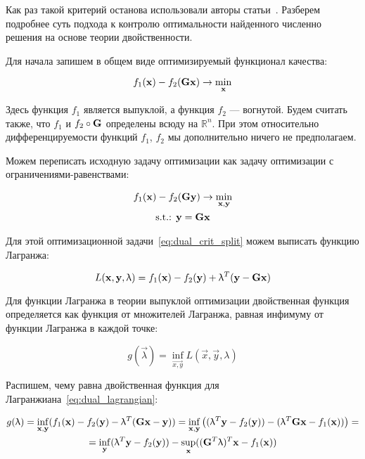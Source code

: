 Как раз такой критерий останова использовали авторы статьи~\cite{gramfort_2012}.
Разберем подробнее суть подхода к контролю оптимальности найденного численно
решения на основе теории двойственности.

Для начала запишем в общем виде оптимизируемый функционал качества:

\begin{equation}
    f_1(\mathbf{x}) - f_2(\mathbf{G}\mathbf{x}) \rightarrow \min_{\mathbf{x}}
    \label{eq:dual_init_crit}
\end{equation}

Здесь функция $f_1$ является выпуклой, а функция $f_2$ --- вогнутой. Будем считать
также, что $f_1$ и $f_2\circ\mathbf{G}$ определены всюду на $\mathbb{R}^n$.
При этом относительно дифференцируемости функций $f_1$, $f_2$ мы дополнительно
ничего не предполагаем.

Можем переписать исходную задачу оптимизации как задачу оптимизации с
ограничениями-равенствами:

\begin{equation}
    \begin{gathered}
        f_1(\mathbf{x}) - f_2(\mathbf{G}\mathbf{y}) \rightarrow \min_{\mathbf{x,y}}\\
        \text{s.t.: } \mathbf{y} = \mathbf{G}\mathbf{x}
    \end{gathered}
    \label{eq:dual_crit_split}
\end{equation}


Для этой оптимизационной задачи~\ref{eq:dual_crit_split} можем выписать функцию Лагранжа:

\begin{equation}
    L(\mathbf{x}, \mathbf{y}, \mathbf{\uplambda}) = f_1(\mathbf{x}) - f_2(\mathbf{y}) + \mathbf{\uplambda}^T(\mathbf{y} - \mathbf{G}\mathbf{x})
    \label{eq:dual_lagrangian}
\end{equation}

Для функции Лагранжа в теории выпуклой оптимизации двойственная
функция определяется как функция от множителей Лагранжа,
равная инфимуму от функции Лагранжа в каждой точке:

\begin{equation}
    g(\vec{\lambda}) = \inf_{\vec{x, y}} L(\vec{x}, \vec{y}, \lambda)
    \label{eq:dual_dual_func_def}
\end{equation}

Распишем, чему равна двойственная функция для Лагранжиана~\ref{eq:dual_lagrangian}:

\begin{multline}
    g(\mathbf{\uplambda}) = \inf_{\mathbf{x}, \mathbf{y}} (f_1(\mathbf{x}) - f_2(\mathbf{y}) - \mathbf{\uplambda}^T(\mathbf{G}\mathbf{x} - \mathbf{y}))
    = \inf_{\mathbf{x}, \mathbf{y}} \left( (\mathbf{\uplambda}^T \mathbf{y} - f_2(\mathbf{y})) - (\mathbf{\uplambda}^T \mathbf{G}\mathbf{x} - f_1(\mathbf{x}))\right) =\\
    = \inf_{\mathbf{y}}(\mathbf{\uplambda}^T \mathbf{y} - f_2(\mathbf{y})) - \sup_{\mathbf{x}}((\mathbf{G}^T\mathbf{\uplambda})^T \mathbf{x} - f_1(\mathbf{x}))
    \label{eq:dual_derive_lagrangian}
\end{multline}

